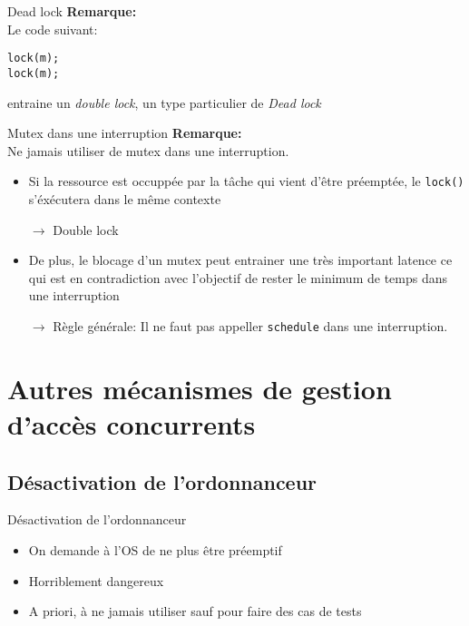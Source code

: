 \begin{frame}[fragile]{Dead lock}
  \textbf{Remarque:} \\
  Le code suivant:
  \begin{lstlisting} 
lock(m);
lock(m); 
  \end{lstlisting} 
  entraine un  \emph{double lock},  un type particulier  de \emph{Dead
    lock}
\end{frame} 

\begin{frame}[fragile]{Mutex dans une interruption}
  \textbf{Remarque:} \\
  Ne jamais utiliser de mutex dans une interruption.
  \begin{itemize} 
  \item Si  la ressource  est occuppée par  la tâche qui  vient d'être
    préemptée, le \texttt{lock()} s'éxécutera dans le même contexte
  \item[$\rightarrow$] Double lock
  \item De plus,  le blocage d'un mutex peut entrainer
    une  très  important latence  ce  qui  est  en contradiction  avec
    l'objectif de rester le minimum de temps dans une interruption
  \item[$\rightarrow$]  Règle  générale:   Il  ne  faut  pas  appeller
    \texttt{schedule} dans une interruption.
  \end{itemize} 
\end{frame} 

\section{Autres mécanismes de gestion d'accès concurrents}


\subsection{Désactivation de l'ordonnanceur}

\begin{frame}{Désactivation de l'ordonnanceur}
  \begin{itemize} 
  \item On demande à l'OS de ne plus être préemptif
  \item Horriblement dangereux
  \item A  priori, à  ne jamais  utiliser sauf pour  faire des  cas de
    tests
  \end{itemize} 
\end{frame} 

